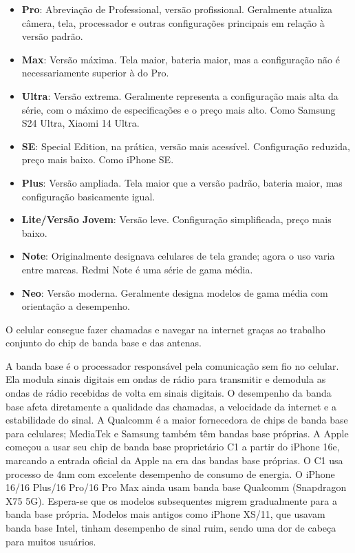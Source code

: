 
\begin{itemize}
  \item \textbf{Pro}: Abreviação de Professional, versão profissional. Geralmente atualiza câmera, tela, processador e outras configurações principais em relação à versão padrão.
  \item \textbf{Max}: Versão máxima. Tela maior, bateria maior, mas a configuração não é necessariamente superior à do Pro.
  \item \textbf{Ultra}: Versão extrema. Geralmente representa a configuração mais alta da série, com o máximo de especificações e o preço mais alto. Como Samsung S24 Ultra, Xiaomi 14 Ultra.
  \item \textbf{SE}: Special Edition, na prática, versão mais acessível. Configuração reduzida, preço mais baixo. Como iPhone SE.
  \item \textbf{Plus}: Versão ampliada. Tela maior que a versão padrão, bateria maior, mas configuração basicamente igual.
  \item \textbf{Lite/Versão Jovem}: Versão leve. Configuração simplificada, preço mais baixo.
  \item \textbf{Note}: Originalmente designava celulares de tela grande; agora o uso varia entre marcas. Redmi Note é uma série de gama média.
  \item \textbf{Neo}: Versão moderna. Geralmente designa modelos de gama média com orientação a desempenho.
\end{itemize}


O celular consegue fazer chamadas e navegar na internet graças ao trabalho conjunto do chip de banda base e das antenas.


A banda base é o processador responsável pela comunicação sem fio no celular. Ela modula sinais digitais em ondas de rádio para transmitir e demodula as ondas de rádio recebidas de volta em sinais digitais. O desempenho da banda base afeta diretamente a qualidade das chamadas, a velocidade da internet e a estabilidade do sinal. A Qualcomm é a maior fornecedora de chips de banda base para celulares; MediaTek e Samsung também têm bandas base próprias. A Apple começou a usar seu chip de banda base proprietário C1 a partir do iPhone 16e, marcando a entrada oficial da Apple na era das bandas base próprias. O C1 usa processo de 4nm com excelente desempenho de consumo de energia. O iPhone 16/16 Plus/16 Pro/16 Pro Max ainda usam banda base Qualcomm (Snapdragon X75 5G). Espera-se que os modelos subsequentes migrem gradualmente para a banda base própria. Modelos mais antigos como iPhone XS/11, que usavam banda base Intel, tinham desempenho de sinal ruim, sendo uma dor de cabeça para muitos usuários.

